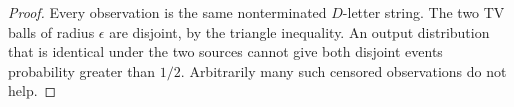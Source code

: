 \begin{proof}
Every observation is the same nonterminated $D$-letter string.
The two TV balls of radius $\epsilon$ are disjoint, by the triangle
inequality. An output distribution that is identical under the two
sources cannot give both disjoint events probability greater than
$1/2$. Arbitrarily many such censored observations do not help.
\end{proof}
